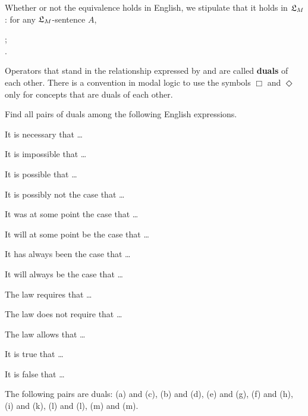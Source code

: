 
Whether or not the equivalence holds in English, we stipulate that it holds in
$\mathfrak{L}_{M}$: for any $\mathfrak{L}_{M}$-sentence $A$,
%
\begin{principles}
;\\
.
\end{principles}


Operators that stand in the relationship expressed by  and 
are called \textbf{duals} of each other. There is a convention in modal logic to
use the symbols $\Box$ and $\Diamond$ only for concepts that are duals of each
other.

\begin{exercise}
  Find all pairs of duals among the following English expressions.
  \begin{exlist}
  \item It is necessary that \ldots
  \item It is impossible that \ldots
  \item It is possible that \ldots
  \item It is possibly not the case that \ldots
  \item It was at some point the case that \ldots
  \item It will at some point be the case that \ldots
  \item It has always been the case that \ldots
  \item It will always be the case that \ldots
  \item The law requires that \ldots
  \item The law does not require that \ldots
  \item The law allows that \ldots
  \item It is true that \ldots
  \item It is false that \ldots
  \end{exlist}
\end{exercise}
\begin{solution}
  The following pairs are duals: (a) and (c), (b) and (d), (e) and
  (g), (f) and (h), (i) and (k), (l) and (l), (m) and (m).
\end{solution}



